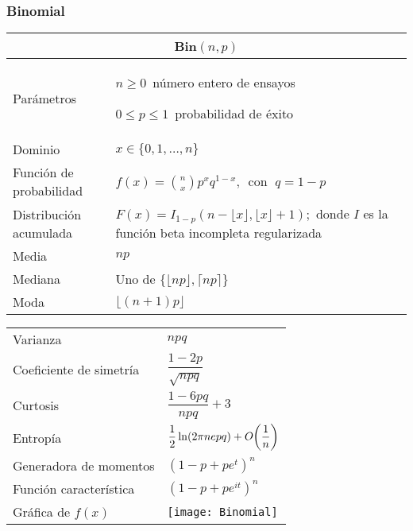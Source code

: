 \documentclass[12pt,a4paper]{article}
\newcommand{\salto}[1][2]{\par\vspace{#1mm}}
\begin{document}
\subsubsection*{Binomial}
\begin{center}
	\begin{tabular}{p{}|p{}}
	\multicolumn{2}{c}{Bin$(n,p)$} \\
	\hline
	Parámetros & $n\geq 0\,$ número entero de ensayos\par $0\leq p\leq 1\,$ probabilidad de éxito \\
	Dominio & $x\in\{0,1,\ldots,n\}$ \\
	Función de probabilidad & $\displaystyle{f(x) = \binom{n}{x}p^x q^{1 - x},\,}$ con $\; q = 1 - p$ \\
	Distribución acumulada & $F(x) = I_{1-p}(n - \lfloor x\rfloor, \lfloor x\rfloor + 1);$ donde $I$ es la función beta incompleta regularizada \\
	Media & $np$ \\
	Mediana & Uno de $\{\lfloor np\rfloor, \lceil np\rceil\}$ \\
	Moda & $\lfloor(n + 1)p\rfloor$
	\end{tabular}
	\begin{tabular}{p{}|p{}}
	Varianza & $npq$ \\
	Coeficiente de simetría & $\dfrac{1 - 2p}{\sqrt{npq}}$ \\
	Curtosis & $\dfrac{1 - 6pq}{npq} + 3$ \\
	Entropía & $\dfrac{1}{2}\ln(2\pi nepq) + O\hspace{-2pt}\left(\dfrac{1}{n}\right)$ \\
	Generadora de momentos & $(1 - p + pe^t)^n$ \\
	Función característica & $(1 - p + pe^{it})^n$ \\
	\vspace{0.25cm}Gráfica de $f(x)$ & \vspace{0.1mm}\texttt{[image: Binomial]}
	\end{tabular}
\end{center}
\salto[20]
\end{document}

